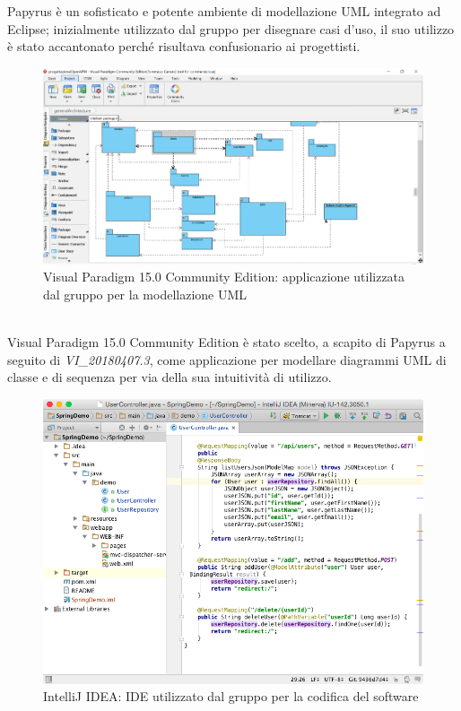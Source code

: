 			Papyrus è un sofisticato e potente ambiente di modellazione UML integrato ad Eclipse; inizialmente utilizzato dal
			gruppo per disegnare casi d'uso, il suo utilizzo è stato accantonato perché risultava confusionario ai progettisti.

\newpage


			\begin{figure}[htbp]
				\centering
				\includegraphics[scale=0.4]{./img/visualparadigm.png}
				\caption[Visual Paradigm 15.0 Community Edition]{Visual Paradigm 15.0 Community Edition:
				applicazione utilizzata dal gruppo per la modellazione UML}
			\end{figure}\\

			Visual Paradigm 15.0 Community Edition è stato scelto, a scapito di Papyrus a seguito di \textit{VI\_20180407.3},
			come applicazione per modellare diagrammi UML di classe e di sequenza per via della sua intuitività di utilizzo.

\newpage


			\begin{figure}[htbp]
				\centering
				\includegraphics[scale=0.4]{./img/IntelliJ.png}
				\caption[IntelliJ IDEA]{IntelliJ IDEA: IDE utilizzato dal gruppo per la codifica del software}
			\end{figure}\\

